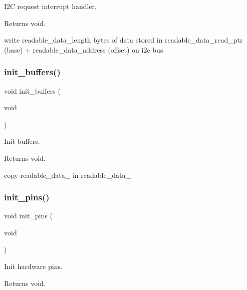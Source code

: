 I2C request interrupt handler. 

\begin{DoxyReturn}{Returns}
void. 
\end{DoxyReturn}
write readable\+\_\+data\+\_\+length bytes of data stored in readable\+\_\+data\+\_\+read\+\_\+ptr (base) + readable\+\_\+data\+\_\+address (offset) on i2c bus \mbox{\label{i2c-rain_8ino_ad241cc00b1a92e6d85827df96778e442}} 
\subsubsection{\texorpdfstring{init\+\_\+buffers()}{init\_buffers()}}
{\footnotesize\ttfamily void init\+\_\+buffers (\begin{DoxyParamCaption}\item[{void}]{ }\end{DoxyParamCaption})}



Init buffers. 

\begin{DoxyReturn}{Returns}
void. 
\end{DoxyReturn}
copy readable\+\_\+data\+\_ in readable\+\_\+data\+\_ \mbox{\label{i2c-rain_8ino_ad8b80a0c08f928106018edd6ea435b95}} 
\subsubsection{\texorpdfstring{init\+\_\+pins()}{init\_pins()}}
{\footnotesize\ttfamily void init\+\_\+pins (\begin{DoxyParamCaption}\item[{void}]{ }\end{DoxyParamCaption})}



Init hardware pins. 

\begin{DoxyReturn}{Returns}
void. 
\end{DoxyReturn}
\mbox{\label{i2c-rain_8ino_afb98a0f07c30784284f48271ffe02b97}} 
